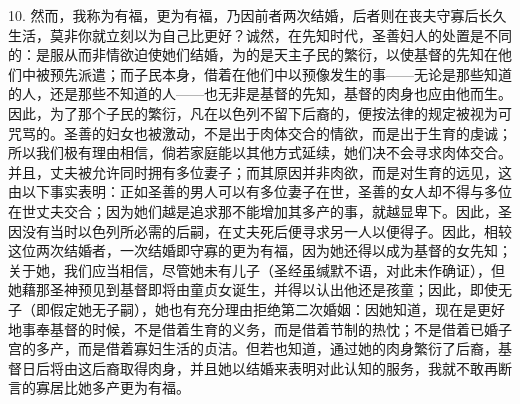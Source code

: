 10. 然而，我称为有福，更为有福，乃因前者两次结婚，后者则在丧夫守寡后长久生活，莫非你就立刻以为自己比更好？诚然，在先知时代，圣善妇人的处置是不同的：是服从而非情欲迫使她们结婚，为的是天主子民的繁衍，以使基督的先知在他们中被预先派遣；而子民本身，借着在他们中以预像发生的事——无论是那些知道的人，还是那些不知道的人——也无非是基督的先知，基督的肉身也应由他而生。因此，为了那个子民的繁衍，凡在以色列不留下后裔的，便按法律的规定被视为可咒骂的。圣善的妇女也被激动，不是出于肉体交合的情欲，而是出于生育的虔诚；所以我们极有理由相信，倘若家庭能以其他方式延续，她们决不会寻求肉体交合。并且，丈夫被允许同时拥有多位妻子；而其原因并非肉欲，而是对生育的远见，这由以下事实表明：正如圣善的男人可以有多位妻子在世，圣善的女人却不得与多位在世丈夫交合；因为她们越是追求那不能增加其多产的事，就越显卑下。因此，圣因没有当时以色列所必需的后嗣，在丈夫死后便寻求另一人以便得子。因此，相较这位两次结婚者，一次结婚即守寡的更为有福，因为她还得以成为基督的女先知；关于她，我们应当相信，尽管她未有儿子（圣经虽缄默不语，对此未作确证），但她藉那圣神预见到基督即将由童贞女诞生，并得以认出他还是孩童；因此，即使无子（即假定她无子嗣），她也有充分理由拒绝第二次婚姻：因她知道，现在是更好地事奉基督的时候，不是借着生育的义务，而是借着节制的热忱；不是借着已婚子宫的多产，而是借着寡妇生活的贞洁。但若也知道，通过她的肉身繁衍了后裔，基督日后将由这后裔取得肉身，并且她以结婚来表明对此认知的服务，我就不敢再断言的寡居比她多产更为有福。\par

